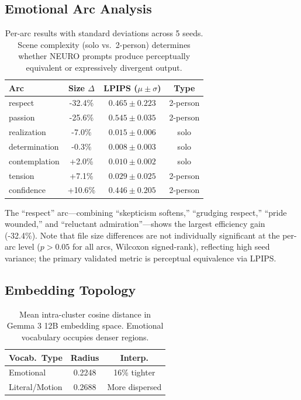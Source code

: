 \documentclass[10pt,twocolumn,letterpaper]{article}
\begin{document}
\subsection{Emotional Arc Analysis}

\begin{table}[t]
\centering
\small
\begin{tabular}{lccc}
\toprule
\textbf{Arc} & \textbf{Size $\Delta$} & \textbf{LPIPS ($\mu \pm \sigma$)} & \textbf{Type} \\
\midrule
respect & -32.4\% & $0.465 \pm 0.223$ & 2-person \\
passion & -25.6\% & $0.545 \pm 0.035$ & 2-person \\
realization & -7.0\% & $0.015 \pm 0.006$ & solo \\
determination & -0.3\% & $0.008 \pm 0.003$ & solo \\
contemplation & +2.0\% & $0.010 \pm 0.002$ & solo \\
tension & +7.1\% & $0.029 \pm 0.025$ & 2-person \\
confidence & +10.6\% & $0.446 \pm 0.205$ & 2-person \\
\bottomrule
\end{tabular}
\caption{Per-arc results with standard deviations across 5 seeds. Scene complexity (solo vs.\ 2-person) determines whether NEURO prompts produce perceptually equivalent or expressively divergent output.}
\end{table}

The ``respect'' arc---combining ``skepticism softens,'' ``grudging respect,'' ``pride wounded,'' and ``reluctant admiration''---shows the largest efficiency gain (-32.4\%). Note that file size differences are not individually significant at the per-arc level ($p > 0.05$ for all arcs, Wilcoxon signed-rank), reflecting high seed variance; the primary validated metric is perceptual equivalence via LPIPS.

\subsection{Embedding Topology}

\begin{table}[t]
\centering
\begin{tabular}{lcc}
\toprule
\textbf{Vocab.\ Type} & \textbf{Radius} & \textbf{Interp.} \\
\midrule
Emotional & 0.2248 & 16\% tighter \\
Literal/Motion & 0.2688 & More dispersed \\
\bottomrule
\end{tabular}
\caption{Mean intra-cluster cosine distance in Gemma 3 12B embedding space. Emotional vocabulary occupies denser regions.}
\end{table}
\end{document}
